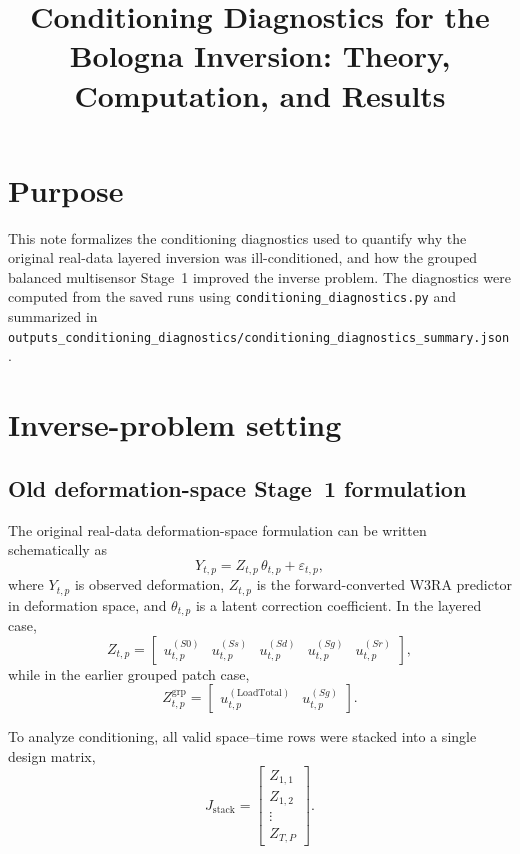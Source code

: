 \documentclass[11pt]{article}
\title{Conditioning Diagnostics for the Bologna Inversion: Theory, Computation, and Results}
\author{}
\date{}
\begin{document}
\maketitle

\section{Purpose}

This note formalizes the conditioning diagnostics used to quantify why the original real-data layered inversion was ill-conditioned, and how the grouped balanced multisensor Stage~1 improved the inverse problem. The diagnostics were computed from the saved runs using
\texttt{conditioning\_diagnostics.py} and summarized in
\texttt{outputs\_conditioning\_diagnostics/conditioning\_diagnostics\_summary.json}.

\section{Inverse-problem setting}

\subsection{Old deformation-space Stage~1 formulation}

The original real-data deformation-space formulation can be written schematically as
\begin{equation}
Y_{t,p} = Z_{t,p}\,\theta_{t,p} + \varepsilon_{t,p},
\end{equation}
where $Y_{t,p}$ is observed deformation, $Z_{t,p}$ is the forward-converted W3RA predictor in deformation space, and $\theta_{t,p}$ is a latent correction coefficient. In the layered case,
\begin{equation}
Z_{t,p}
=
\begin{bmatrix}
u^{(S0)}_{t,p} &
u^{(Ss)}_{t,p} &
u^{(Sd)}_{t,p} &
u^{(Sg)}_{t,p} &
u^{(Sr)}_{t,p}
\end{bmatrix},
\end{equation}
while in the earlier grouped patch case,
\begin{equation}
Z_{t,p}^{\mathrm{grp}}
=
\begin{bmatrix}
u^{(\mathrm{LoadTotal})}_{t,p} &
u^{(Sg)}_{t,p}
\end{bmatrix}.
\end{equation}

To analyze conditioning, all valid space--time rows were stacked into a single design matrix,
\begin{equation}
J_{\mathrm{stack}}
=
\begin{bmatrix}
Z_{1,1} \\
Z_{1,2} \\
\vdots \\
Z_{T,P}
\end{bmatrix}.
\end{equation}
\end{document}
